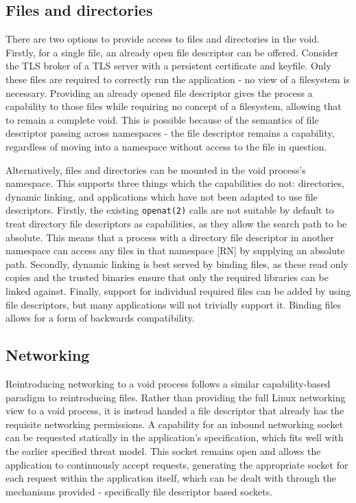 \documentclass[sigplan]{acmart}
\begin{document}
\subsection{Files and directories} There are two options to provide access to files and directories in the void. Firstly, for a single file, an already open file descriptor can be offered. Consider the TLS broker of a TLS server with a persistent certificate and keyfile. Only these files are required to correctly run the application - no view of a filesystem is necessary. Providing an already opened file descriptor gives the process a capability to those files while requiring no concept of a filesystem, allowing that to remain a complete void. This is possible because of the semantics of file descriptor passing across namespaces - the file descriptor remains a capability, regardless of moving into a namespace without access to the file in question.

Alternatively, files and directories can be mounted in the void process's namespace. This supports three things which the capabilities do not: directories, dynamic linking, and applications which have not been adapted to use file descriptors. Firstly, the existing \texttt{openat(2)} calls are not suitable by default to treat directory file descriptors as capabilities, as they allow the search path to be absolute. This means that a process with a directory file descriptor in another namespace can access any files in that namespace [RN] by supplying an absolute path. Secondly, dynamic linking is best served by binding files, as these read only copies and the trusted binaries ensure that only the required libraries can be linked against. Finally, support for individual required files can be added by using file descriptors, but many applications will not trivially support it. Binding files allows for a form of backwards compatibility.

\subsection{Networking}

Reintroducing networking to a void process follows a similar capability-based paradigm to reintroducing files. Rather than providing the full Linux networking view to a void process, it is instead handed a file descriptor that already has the requisite networking permissions. A capability for an inbound networking socket can be requested statically in the application's specification, which fits well with the earlier specified threat model. This socket remains open and allows the application to continuously accept requests, generating the appropriate socket for each request within the application itself, which can be dealt with through the mechanisms provided - specifically file descriptor based sockets.
\end{document}
